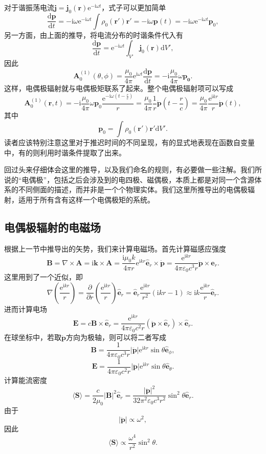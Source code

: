 \documentclass[UTF8]{ctexbook}
\newcommand{\e}{\mathrm{e}}
\renewcommand{\d}{\mathrm{d}}
\renewcommand{\b}{\boldsymbol}
\renewcommand{\i}{\mathrm{i}}
\numberwithin{equation}{chapter}
\begin{document}
	对于谐振荡电流$\b{j}=\b{j}_0(\b{r})\e^{-\i\omega t}$，式子可以更加简单
	\[\frac{\d \b{p}}{\d t}=-\i\omega\e^{-\i\omega t}\int\rho_0(\b{r}')\b{r}'=-\i\omega\b{p}(t)=-\i\omega\e^{-\i\omega t}\b{p}_0,\]
	另一方面，由上面的推导，将电流分布的时谐条件代入有
	\[\frac{\d \b{p}}{\d t}=\e^{-\i\omega t}\int_{V'}\b{j}_0(\b{r})\d V',\]
	因此
	\[\b{A}_0^{(1)}(\theta,\phi)=\frac{\mu_0}{4\pi}\e^{\i\omega t}\frac{\d \b{p}}{\d t}=-\i\frac{\mu_0}{4\pi}\omega\b{p_0}.\]
	这样，电偶极辐射就与电偶极矩联系了起来。整个电偶极辐射项可以写成
	\[\b{A}_0^{(1)}(\b{r},t)=-\i\frac{\mu_0}{4\pi}\omega\b{p}_0\frac{\e^{-\i\omega\left(t-\frac{r}{c}\right)}}{r}=\frac{\mu_0}{4\pi}\frac{1}{r}\dot{\b{p}}\left(t-\frac{r}{c}\right)=\frac{\mu_0}{4\pi}\frac{\e^{\i kr}}{r}\dot{\b{p}}(t),\]
	其中
	\[\b{p}_0=\int \rho_0(\b{r}')\b{r}'\d V'.\]
	读者应该特别注意这里对于推迟时间的不同呈现，有的显式地表现在函数自变量中，有的则利用时谐条件提取了出来。
	
	回过头来仔细体会这里的推导，以及我们命名的规则，有必要做一些注解。我们所说的“电偶极”，包括之后会涉及到的电四极、磁偶极，本质上都是对同一个含源体系的不同侧面的描述，而并非是一个个物理实体。我们这里所推导出的电偶极辐射，适用于所有含有这样一个电偶极矩的系统。
	
	\subsection{电偶极辐射的电磁场}
	根据上一节中推导出的矢势，我们来计算电磁场。首先计算磁感应强度
	\[\b{B}=\nabla\times\b{A}=\i\b{k}\times\b{A}=\frac{\i\mu_0 k}{4\pi r}\e^{\i k r}\hat{\b{e}}_r\times\dot{\b{p}}=\frac{\e^{\i kr}}{4\pi\varepsilon_0c^3r}\ddot{\b{p}}\times\hat{\b{e}}_r.\]
	这里用到了一个近似，即
	\[\nabla\left(\frac{\e^{\i kr}}{r}\right)=\frac{\partial }{\partial r}\left(\frac{\e^{\i kr}}{r}\right)\hat{\b{e}}_r=\hat{\b{e}}_r\frac{\e^{\i kr}}{r^2}(\i kr-1)\approx \i k\frac{\e^{\i kr}}{r}\hat{\b{e}}_r.\]
	进而计算电场
	\[\b{E}=c\b{B}\times\hat{\b{e}}_r=\frac{\e^{\i kr}}{4\pi\varepsilon_0c^2r}(\ddot{\b{p}}\times\hat{\b{e}}_r)\times\hat{\b{e}}_r.\]
	在球坐标中，若取$\ddot{\b{p}}$方向为极轴，则可以将二者写成
	\[\b{B}=\frac{1}{4\pi\varepsilon_0c^3r}|\ddot{\b{p}}|\e^{\i kr}\sin\theta \hat{\b{e}}_\phi,\]
	\[\b{E}=\frac{1}{4\pi\varepsilon_0c^2r}|\ddot{\b{p}}|\e^{\i kr}\sin\theta\hat{\b{e}}_\theta.\]
	计算能流密度
	\[\langle \b{S}\rangle=\frac{c}{2\mu_0}|\b{B}|^2\hat{\b{e}}_r=\frac{|\ddot{\b{p}}|^2}{32\pi^2\varepsilon_0c^3r^2}\sin^2\theta\hat{\b{e}}_r.\]
	由于
	\[|\ddot{\b{p}}|\propto\omega^2,\]
	因此
	\[\langle \b{S}\rangle\propto \frac{\omega^4}{r^2}\sin^2\theta.\]
	
\end{document}
